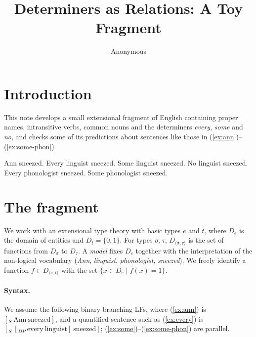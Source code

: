 \documentclass{article}
\title{Determiners as Relations: A Toy Fragment}
\author{Anonymous}
\begin{document}
\maketitle

\section{Introduction}

This note develops a small extensional fragment of English containing
proper names, intransitive verbs, common nouns and the determiners
\textit{every}, \textit{some} and \textit{no}, and checks some of its
predictions about sentences like those in (\ref{ex:ann})--(\ref{ex:some-phon}).

\begin{exe}
  \ex\label{ex:ann} Ann sneezed.
  \ex\label{ex:every} Every linguist sneezed.
  \ex\label{ex:some} Some linguist sneezed.
  \ex\label{ex:no} No linguist sneezed.
  \ex\label{ex:every-phon} Every phonologist sneezed.
  \ex\label{ex:some-phon} Some phonologist sneezed.
\end{exe}

\section{The fragment}

We work with an extensional type theory with basic types $e$ and $t$, where
$D_e$ is the domain of entities and $D_t = \{0, 1\}$. For types $\sigma,
\tau$, $D_{\langle\sigma,\tau\rangle}$ is the set of functions from
$D_\sigma$ to $D_\tau$. A \emph{model} fixes $D_e$ together with the
interpretation of the non-logical vocabulary (\textit{Ann}, \textit{linguist},
\textit{phonologist}, \textit{sneezed}). We freely identify a function $f \in
D_{\langle e,t\rangle}$ with the set $\{x \in D_e \mid f(x) = 1\}$.

\paragraph{Syntax.} We assume the following binary-branching LFs, where
(\ref{ex:ann}) is $[_S\ \text{Ann}\ \text{sneezed}]$, and a quantified sentence
such as (\ref{ex:every}) is $[_S\ [_{DP}\ \text{every}\ \text{linguist}]\
\text{sneezed}]$; (\ref{ex:some})--(\ref{ex:some-phon}) are parallel.
\end{document}
